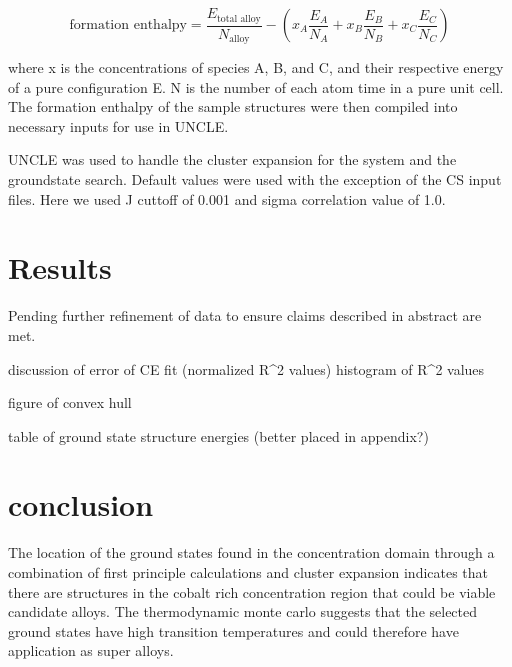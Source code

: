 \documentclass{article}
\begin{document}
$$ \text{formation enthalpy} = \frac{E_{\text{total alloy}}}{N_{\text{alloy}}} - (x_A \frac{E_A}{N
_A} + x_B \frac{E_B}{N
_B} + x_C \frac{E_C}{N
_C}) $$

where x is the concentrations of species A, B, and C, and their respective energy of a pure configuration E. N is the number of each atom time in a pure unit cell. The formation enthalpy of the sample structures were then compiled into necessary inputs for use in UNCLE.

UNCLE was used to handle the cluster expansion for the system and the groundstate search. Default values were used with the exception of the CS input files. Here we used J cuttoff of 0.001 and sigma correlation value of 1.0.

\section{Results}

Pending further refinement of data to ensure claims described in abstract are met.

discussion of error of CE fit (normalized R^2 values)
histogram of R^2 values

figure of convex hull

table of ground state structure energies (better placed in appendix?)

\section{conclusion}
The location of the ground states found in the concentration domain through a combination of first principle calculations and cluster expansion indicates that there are structures in the cobalt rich concentration region that could be viable candidate alloys. The thermodynamic monte carlo suggests that the selected ground states have high transition temperatures and could therefore have application as super alloys.



\end{document}
